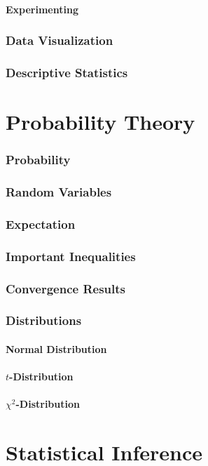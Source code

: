 \documentclass{article}
\begin{document}
\subsection{Experimenting}


\section{Data Visualization}
\section{Descriptive Statistics}

\newpage
\part{Probability Theory}
\section{Probability}
\section{Random Variables}
\section{Expectation}
\section{Important Inequalities}
\section{Convergence Results}
\section{Distributions}
\subsection{Normal Distribution}
\subsection{$t$-Distribution}
\subsection{$\chi^2$-Distribution}

\newpage
\part{Statistical Inference}
\end{document}
